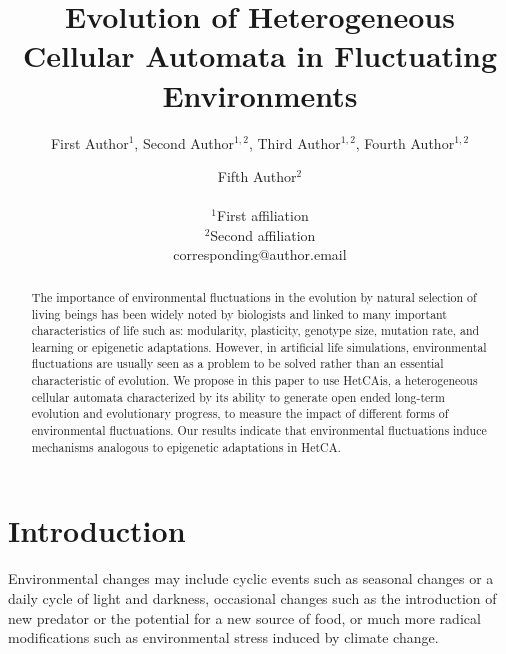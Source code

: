 \documentclass[letterpaper]{article}
\title{Evolution of Heterogeneous Cellular Automata in Fluctuating Environments}
\author{First Author$^{1}$, Second Author$^{1,2}$, Third Author$^{1,2}$, Fourth Author$^{1,2}$ \and Fifth Author$^2$ \\
\mbox{}\\
$^1$First affiliation  \\
$^2$Second affiliation \\
corresponding@author.email}
\begin{document}
\maketitle

\begin{abstract}
The importance of environmental fluctuations in the evolution by natural selection of living beings has been widely noted by biologists and linked to many important characteristics of life such as: modularity, plasticity, genotype size, mutation rate, and learning or epigenetic adaptations. However, in artificial life simulations, environmental fluctuations are usually seen as a problem to be solved rather than an essential characteristic of evolution. We propose in this paper to use HetCAis, a heterogeneous cellular automata characterized by its ability to generate open ended long-term evolution and evolutionary progress, to measure the impact of different forms of environmental fluctuations. Our results indicate that environmental fluctuations induce mechanisms analogous to epigenetic adaptations in HetCA.
\end{abstract}



\section{Introduction}\label{secintro}
Environmental changes may include cyclic events such as seasonal changes or a daily cycle of light and darkness, occasional changes such as the introduction of new predator or the potential for a new source of food, or much more radical modifications such as environmental stress induced by climate change.
\end{document}
